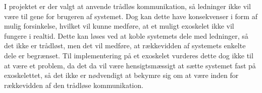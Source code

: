 I projektet er der valgt at anvende trådløs kommunikation, så ledninger ikke vil være til gene for brugeren af systemet. Dog kan dette have konsekvenser i form af mulig forsinkelse, hvilket vil kunne medføre, at et muligt exoskelet ikke vil fungere i realtid. Dette kan løses ved at koble systemets dele med ledninger, så det ikke er trådløst, men det vil medføre, at rækkevidden af systemets enkelte dele er begrænset. Til implementering på et exoskelet vurderes dette dog ikke til at være et problem, da det da vil være hensigtsmæssigt at sætte systemet fast på exoskelettet, så det ikke er nødvendigt at bekymre sig om at være inden for rækkevidden af den trådløse kommunikation.







